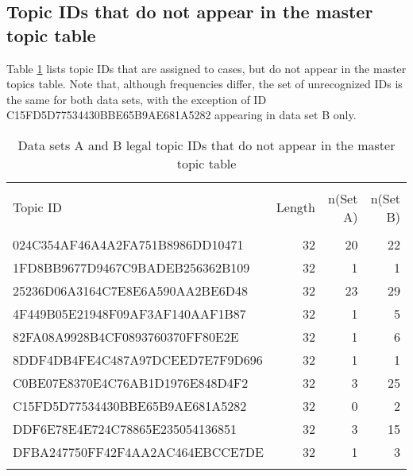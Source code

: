 \documentclass[10pt, letterpaper]{article}
\begin{document}
\begin{spacing}{1.0}

\section*{Topic IDs that do not appear in the master topic table}

Table \ref{tab:UnknownTopicID} lists topic IDs that are assigned to cases, but do not appear in the master topics table.  Note that, although frequencies differ, the set of unrecognized IDs is the same for both data sets, with the exception of ID C15FD5D77534430BBE65B9AE681A5282 appearing in data set B only.\\

\begin{table}[H]
    \centering
    \caption{Data sets A and B legal topic IDs that do not appear in the master topic table}
    \begin{tabular}{lrrr}
        \hline\\[-6pt]
        Topic ID & Length & n(Set A) & n(Set B)\\[2pt]
        \hline\\[-6pt]
        024C354AF46A4A2FA751B8986DD10471 & 32 & 20 & 22\\
        1FD8BB9677D9467C9BADEB256362B109 & 32 & 1 & 1\\
        25236D06A3164C7E8E6A590AA2BE6D48 & 32 & 23 & 29\\
        4F449B05E21948F09AF3AF140AAF1B87 & 32 & 1 & 5\\
        82FA08A9928B4CF0893760370FF80E2E & 32 & 1 & 6\\
        8DDF4DB4FE4C487A97DCEED7E7F9D696 & 32 & 1 & 1\\
        C0BE07E8370E4C76AB1D1976E848D4F2 & 32 & 3 & 25\\
        C15FD5D77534430BBE65B9AE681A5282 & 32 & 0 & 2\\
        DDF6E78E4E724C78865E235054136851 & 32 & 3 & 15\\
        DFBA247750FF42F4AA2AC464EBCCE7DE & 32 & 1 & 3\\
        \hline\\[-6pt]
\end{tabular}
\label{tab:UnknownTopicID}
\end{table}



\end{spacing}
\end{document}
